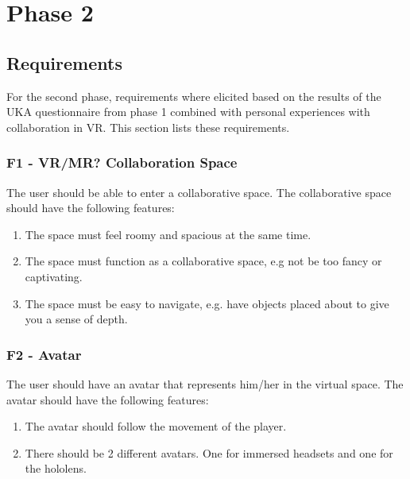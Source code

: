\chapter{Phase 2}
    \section{Requirements}
    For the second phase, requirements where elicited based on the results of the UKA questionnaire from phase 1 combined with personal experiences with collaboration in VR. This section lists these requirements.
    
    
        \subsection{F1 - VR/MR? Collaboration Space}
        The user should be able to enter a collaborative space. The collaborative space should have the following features:
        \begin{enumerate}
            \item The space must feel roomy and spacious at the same time.
            \item The space must function as a collaborative space, e.g not be too fancy or captivating.  
            \item The space must be easy to navigate, e.g. have objects placed about to give you a sense of depth.
        \end{enumerate}
        
        \subsection{F2 - Avatar}
        The user should have an avatar that represents him/her in the virtual space. The avatar should have the following features:
        \begin{enumerate}
            \item The avatar should follow the movement of the player. 
            \item There should be 2 different avatars. One for immersed headsets and one for the hololens.
        \end{enumerate}
        
